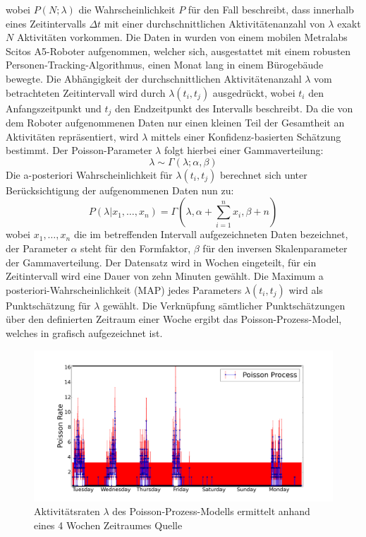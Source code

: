 wobei $P(N;\lambda)$ die Wahrscheinlichkeit $P$ für den Fall beschreibt, dass innerhalb eines Zeitintervalls $\Delta t$ mit einer durchschnittlichen Aktivitätenanzahl von $\lambda$ exakt $N$ Aktivitäten vorkommen. Die Daten in \cite{Jovan.2016} wurden von einem mobilen Metralabs Scitos A5-Roboter aufgenommen, welcher sich, ausgestattet mit einem robusten Personen-Tracking-Algorithmus, einen Monat lang in einem Bürogebäude bewegte. Die Abhängigkeit der durchschnittlichen Aktivitätenanzahl $\lambda$ vom betrachteten Zeitintervall wird durch $\lambda (t_i, t_j)$ ausgedrückt, wobei  $t_i$ den Anfangszeitpunkt und $t_j$ den Endzeitpunkt des Intervalls beschreibt. Da die von dem Roboter aufgenommenen Daten nur einen kleinen Teil der Gesamtheit an Aktivitäten repräsentiert, wird $\lambda$ mittels einer Konfidenz-basierten Schätzung bestimmt. Der Poisson-Parameter $\lambda$ folgt hierbei einer Gammaverteilung:
\begin{equation}
	\lambda \sim \Gamma(\lambda ; \alpha, \beta)
\end{equation}
Die a-posteriori Wahrscheinlichkeit für $\lambda (t_i, t_j)$ berechnet sich unter Berücksichtigung der aufgenommenen Daten nun zu:
\begin{equation}
	P(\lambda | x_1, \dots, x_n) = \Gamma(\lambda, \alpha + \sum_{i=1}^{n} x_i, \beta +n)
\end{equation}
wobei $x_1, \dots , x_n$ die im betreffenden Intervall aufgezeichneten Daten bezeichnet, der Parameter $\alpha$ steht für den Formfaktor, $\beta$ für den inversen Skalenparameter der Gammaverteilung.
Der Datensatz wird in Wochen eingeteilt, für ein Zeitintervall wird eine Dauer von zehn Minuten gewählt. Die Maximum a posteriori-Wahrscheinlichkeit (MAP) jedes Parameters $\lambda(t_i, t_j)$ wird als Punktschätzung für $\lambda$ gewählt. Die Verknüpfung sämtlicher Punktschätzungen über den definierten Zeitraum einer Woche ergibt das Poisson-Prozess-Model, welches in  grafisch aufgezeichnet ist. 
\begin{figure}[!ht]
	\begin{center}
		\includegraphics[width=0.7\linewidth]{Abbildungen/poisson-prozess-model1}
		\caption{Aktivitätsraten $\lambda$ des Poisson-Prozess-Modells ermittelt anhand eines 4 Wochen Zeitraumes Quelle \cite{Jovan.2016}}
		\label{fig.poisson-prozess-model1}
	\end{center}
\end{figure}

